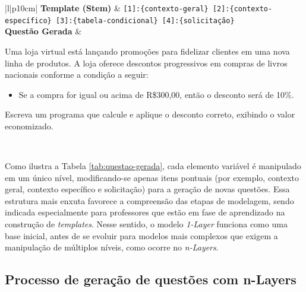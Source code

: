 \begin{table}[htbp]
\centering
\begin{tabular}{|l|p{10cm}|}
\hline
\textbf{Template (Stem)} 
& \texttt{[1]:\{contexto-geral\} [2]:\{contexto-específico\} [3]:\{tabela-condicional\} [4]:\{solicitação\}} \\
\hline
\textbf{Questão Gerada} 
& 
\begin{minipage}[t]{\linewidth}
\vspace{0.5em}
Uma loja virtual está lançando promoções para fidelizar clientes em uma nova linha de produtos.  
A loja oferece descontos progressivos em compras de livros nacionais conforme a condição a seguir:  
\begin{itemize}[leftmargin=1em]
    \item Se a compra for igual ou acima de R\$300,00, então o desconto será de 10\%.
\end{itemize}
Escreva um programa que calcule e aplique o desconto correto, exibindo o valor economizado. 
\vspace{0.5em}
\end{minipage} \\
\hline
\end{tabular}
\caption{Questão gerada (Autoria Própria, 2024)}
\label{tab:questao-gerada}
\end{table}



Como ilustra a Tabela \ref{tab:questao-gerada}, cada elemento variável é manipulado em um único nível, modificando-se apenas itens pontuais (por exemplo, contexto geral, contexto específico e solicitação) para a geração de novas questões. Essa estrutura mais enxuta favorece a compreensão das etapas de modelagem, sendo indicada especialmente para professores que estão em fase de aprendizado na construção de \textit{templates}. Nesse sentido, o modelo \textit{1-Layer} funciona como uma base inicial, antes de se evoluir para modelos mais complexos que exigem a manipulação de múltiplos níveis, como ocorre no \textit{n-Layers}.

\subsection{Processo de geração de questões com  n-Layers}


